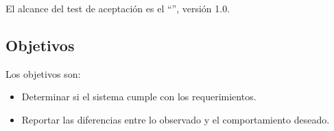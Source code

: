 \documentclass[
	14pt,
	a4paper
]{article}
\begin{document}
El alcance del test de aceptación es el ``\MyTitle '', versión 1.0.

\subsection{Objetivos}
\label{sub:objetivos}

Los objetivos son:

\begin{itemize}
	\item Determinar si el sistema cumple con los requerimientos.
	\item Reportar las diferencias entre lo observado y el comportamiento deseado.
\end{itemize}
\end{document}
